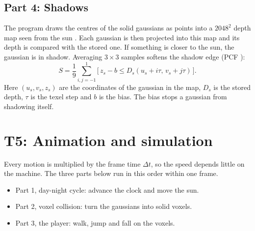 \documentclass[9pt,twocolumn,a4paper]{extarticle}
\begin{document}
\subsection{Part 4: Shadows}
The program draws the centres of the solid gaussians as points into a $2048^2$ depth map seen from the sun \cite{williams1978}. Each gaussian is then projected into this map and its depth is compared with the stored one. If something is closer to the sun, the gaussian is in shadow. Averaging $3\times3$ samples softens the shadow edge (PCF \cite{reeves1987}):
\begin{equation}
S=\frac19\sum_{i,j=-1}^{1}\big[\,z_s-b\le D_s(u_s+i\tau,\,v_s+j\tau)\,\big].
\label{eq:pcf}
\end{equation}
Here $(u_s,v_s,z_s)$ are the coordinates of the gaussian in the map, $D_s$ is the stored depth, $\tau$ is the texel step and $b$ is the bias. The bias stops a gaussian from shadowing itself.

\par\noindent{}\par\vspace{3pt}

\par\noindent{}\par\vspace{3pt}

\section{T5: Animation and simulation}
\label{chap:t5}
Every motion is multiplied by the frame time $\Delta t$, so the speed depends little on the machine. The three parts below run in this order within one frame.
\begin{itemize}\itemsep0pt
\item Part 1, day-night cycle: advance the clock and move the sun.
\item Part 2, voxel collision: turn the gaussians into solid voxels.
\item Part 3, the player: walk, jump and fall on the voxels.
\end{itemize}
\end{document}
